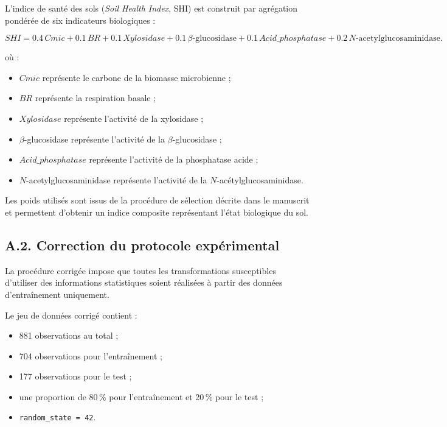 L'indice de santé des sols (\textit{Soil Health Index}, SHI) est construit
par agrégation pondérée de six indicateurs biologiques :

\begin{equation}
SHI =
0.4\,Cmic
+0.1\,BR
+0.1\,Xylosidase
+0.1\,\beta\text{-glucosidase}
+0.1\,Acid\_phosphatase
+0.2\,N\text{-acetylglucosaminidase}.
\end{equation}

où :

\begin{itemize}
    \item $Cmic$ représente le carbone de la biomasse microbienne ;
    \item $BR$ représente la respiration basale ;
    \item $Xylosidase$ représente l'activité de la xylosidase ;
    \item $\beta$-glucosidase représente l'activité de la
    $\beta$-glucosidase ;
    \item $Acid\_phosphatase$ représente l'activité de la phosphatase acide ;
    \item $N$-acetylglucosaminidase représente l'activité de la
    $N$-acétylglucosaminidase.
\end{itemize}

Les poids utilisés sont issus de la procédure de sélection décrite dans le
manuscrit et permettent d'obtenir un indice composite représentant l'état
biologique du sol.

\subsection*{A.2. Correction du protocole expérimental}

La procédure corrigée impose que toutes les transformations susceptibles
d'utiliser des informations statistiques soient réalisées à partir des
données d'entraînement uniquement.

Le jeu de données corrigé contient :

\begin{itemize}
    \item 881 observations au total ;
    \item 704 observations pour l'entraînement ;
    \item 177 observations pour le test ;
    \item une proportion de 80\,\% pour l'entraînement et 20\,\% pour le test ;
    \item \texttt{random\_state = 42}.
\end{itemize}

